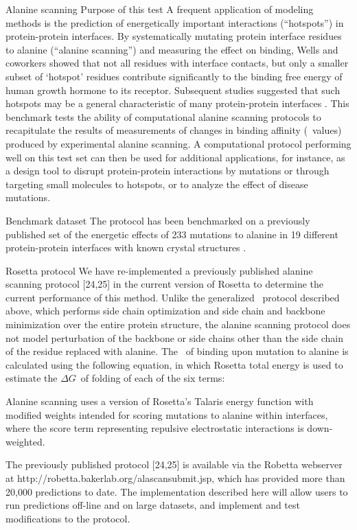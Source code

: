 Alanine scanning
Purpose of this test
A frequent application of modeling methods is the prediction of energetically important interactions (“hotspots”) in protein-protein interfaces. By systematically mutating protein interface residues to alanine (“alanine scanning”) and measuring the effect on binding, Wells and coworkers \cite{clackson_hot_1995} showed that not all residues with interface contacts, but only a smaller subset of ‘hotspot’ residues contribute significantly to the binding free energy of human growth hormone to its receptor. Subsequent studies suggested that such hotspots may be a general characteristic of many protein-protein interfaces \cite{bogan_anatomy_1998,darnell_kfc_2008}. This benchmark tests the ability of computational alanine scanning protocols to recapitulate the results of measurements of changes in binding affinity (\ddg\ values) produced by experimental alanine scanning. A computational protocol performing well on this test set can then be used for additional applications, for instance, as a design tool to disrupt protein-protein interactions by mutations or through targeting small molecules to hotspots, or to analyze the effect of disease mutations.

Benchmark dataset
The protocol has been benchmarked on a previously published set of the energetic effects of 233 mutations to alanine in 19 different protein-protein interfaces with known crystal structures \cite{kortemme_simple_2002}.

Rosetta protocol
We have re-implemented a previously published alanine scanning protocol [24,25] in the current version of Rosetta to determine the current performance of this method. Unlike the generalized \ddg\ protocol described above, which performs side chain optimization and side chain and backbone minimization over the entire protein structure, the alanine scanning protocol does not model perturbation of the backbone or side chains other than the side chain of the residue replaced with alanine.
The \ddg\ of binding upon mutation to alanine is calculated using the following equation, in which Rosetta total energy is used to estimate the $\Delta G$\ of folding of each of the six terms:



Alanine scanning uses a version of Rosetta’s Talaris energy function with modified weights intended for scoring mutations to alanine within interfaces, where the score term representing repulsive electrostatic interactions is down-weighted.

The previously published protocol [24,25] is available via the Robetta webserver at http://robetta.bakerlab.org/alascansubmit.jsp, which has provided more than 20,000 predictions to date. The implementation described here will allow users to run predictions off-line and on large datasets, and implement and test modifications to the protocol.

